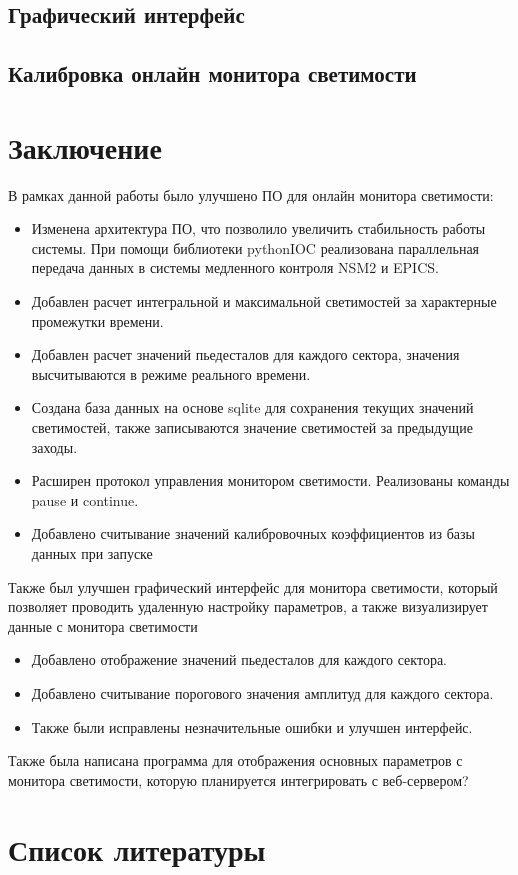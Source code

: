 \documentclass[a4paper, 12pt]{article}
\begin{document}
    \subsection{Графический интерфейс}
    
    \subsection{Калибровка онлайн монитора светимости}
    

\section*{Заключение}
    В рамках данной работы было улучшено ПО для онлайн монитора светимости:
    \begin{itemize}
        \item Изменена архитектура ПО, что позволило увеличить стабильность работы системы. При помощи библиотеки pythonIOC реализована параллельная передача данных в системы медленного контроля NSM2 и EPICS.
        \item Добавлен расчет интегральной и максимальной светимостей за характерные промежутки времени.
        \item Добавлен расчет значений пьедесталов для каждого сектора, значения высчитываются в режиме реального времени.
        \item Создана база данных на основе sqlite для сохранения текущих значений светимостей, также записываются значение светимостей за предыдущие заходы.
        \item Расширен протокол управления монитором светимости. Реализованы команды pause и continue.
        \item Добавлено считывание значений калибровочных коэффициентов из базы данных при запуске
    \end{itemize}
    
    Также был улучшен графический интерфейс для монитора светимости, который позволяет проводить удаленную настройку параметров, а также визуализирует данные с монитора светимости
    \begin{itemize} 
        \item Добавлено отображение значений пьедесталов для каждого сектора.
        \item Добавлено считывание порогового значения амплитуд для каждого сектора.
        \item Также были исправлены незначительные ошибки и улучшен интерфейс.
    \end{itemize}
    
    Также была написана программа для отображения основных параметров с монитора светимости, которую планируется интегрировать с веб-сервером?

\section*{Список литературы}
\end{document}
